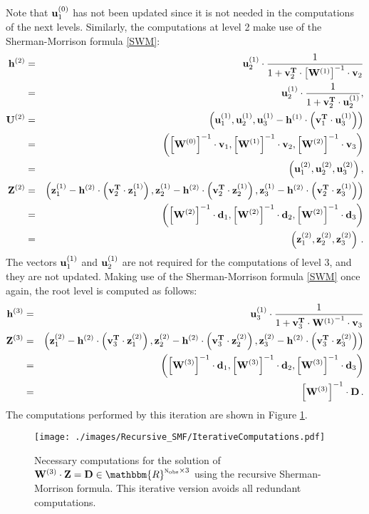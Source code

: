 \documentclass[12pt]{article}
\newcommand{\inv}[1]{\left[{\bf W^{(\rm #1)}}\right]^{\rm -1}}
\newcommand{\Nobs}{\textsc{n}_{{\rm obs}}}
\newcommand{\Z}{{\bf Z}}
\newcommand{\sZ}[1]{{\bf Z}^{\left(\rm #1 \right)}}
\newcommand{\h}[1]{{\bf h}^{\left( \rm #1\right)}}
\newcommand{\U}[1]{{\bf U}^{\left ( \rm #1 \right)}}
\renewcommand{\u}[2]{{\bf u}_{\rm #1}^{(\rm #2)}}
\newcommand{\sz}[2]{{\bf z}_{\rm #1}^{(\rm #2)}}
\newcommand{\D}{{\bf D}}
\renewcommand{\d}[1]{{\bf d}_{\rm #1}}
\newcommand{\W}[1]{{{\bf W}^{\left ( {\rm #1} \right )}}}
\renewcommand{\v}[1]{{\bf v}_{{\rm #1}}}
\renewcommand{\Re}{\mathbbm{R}}
\newcommand{\invS}[1]{ {#1^{-1}}}
\begin{document}
Note that $\u{1}{0}$ has not been updated since it is not needed in the computations of the next levels. Similarly, the computations at level 2 make use of the Sherman-Morrison formula \eqref{SWM}:
\begin{eqnarray} \nonumber
\displaystyle \h{2} &=& \u{2}{1} \cdot \frac{1}{1+\v{2}^{\bf T} \cdot \inv{1} \cdot \v{2} } \\ \nonumber
&=& \u{2}{1} \cdot \frac{1}{1+\v{2}^{\bf T} \cdot \u{2}{1} }, \\ \nonumber
 \U{2} &=& \left( \u{1}{1}, \u{2}{1}, \u{3}{1}-\h{1} \cdot \left( \v{1}^{\bf T} \cdot \u{3}{1} \right )\right) \\ \nonumber
 &=& \left( \inv{0} \cdot \v{1},\inv{1} \cdot \v{2},\inv{2} \cdot \v{3}\right ) \\ \nonumber 
 &=& \left( \u{1}{2}, \u{2}{2}, \u{3}{2}\right), \\ \nonumber
 \sZ{2} &=& \left( \sz{1}{1}-\h{2} \cdot \left( \v{2}^{\bf T} \cdot \sz{1}{1}\right),\sz{2}{1}-\h{2} \cdot \left( \v{2}^{\bf T} \cdot \sz{2}{1}\right),\sz{3}{1}-\h{2} \cdot \left( \v{2}^{\bf T} \cdot \sz{3}{1}\right) \right ) \\ \nonumber
 &=& \left( \inv{2} \cdot \d{1},\inv{2} \cdot \d{2},\inv{2} \cdot \d{3}\right ) \\ \nonumber 
 &=& \left( \sz{1}{2},\sz{2}{2},\sz{3}{2} \right)\,.
\end{eqnarray}
The vectors $\u{1}{1}$ and $\u{2}{1}$ are not required for the computations of level 3, and they are not updated. Making use of the Sherman-Morrison formula
\eqref{SWM} once again, the root level is computed as follows:
\begin{eqnarray} \nonumber
\displaystyle \h{3} &=& \u{3}{1} \cdot \frac{1}{1+\v{3}^{\bf T} \cdot \invS{\W{1}} \cdot \v{3} } \\ \nonumber
 \sZ{3} &=& \left( \sz{1}{2}-\h{2} \cdot \left( \v{3}^{\bf T} \cdot \sz{1}{2}\right),\sz{2}{2}-\h{2} \cdot \left( \v{3}^{\bf T} \cdot \sz{2}{2}\right),\sz{3}{2}-\h{2} \cdot \left( \v{3}^{\bf T} \cdot \sz{3}{2}\right) \right ) \\ \nonumber
 &=& \left( \inv{3} \cdot \d{1},\inv{3} \cdot \d{2},\inv{3} \cdot \d{3}\right ) \\ \nonumber 
 &=& \inv{3} \cdot \D\,.
\end{eqnarray}
The computations performed by this iteration are shown in Figure \ref{Fig:sherman-optimal}. 
\begin{figure}[H]
  \centering
	      \texttt{[image: ./images/Recursive\_SMF/IterativeComputations.pdf]}
  \caption{\label{Fig:sherman-optimal}Necessary computations for the solution of $\W{3} \cdot \Z=\D \in \Re^{\Nobs \times 3}$ using the recursive 
  Sherman-Morrison formula. This iterative version avoids all redundant computations.}
\end{figure}
\end{document}
